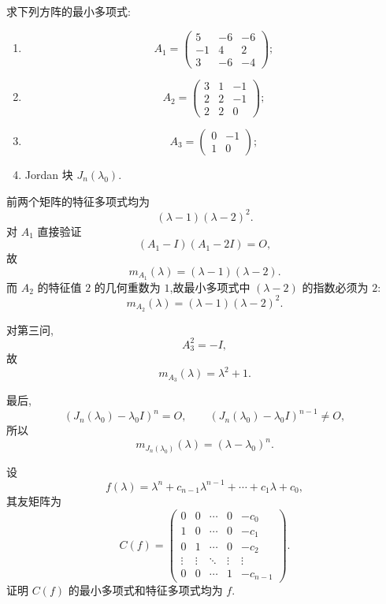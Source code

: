 \begin{example}
求下列方阵的最小多项式:
\begin{enumerate}
    \item
    \[
    A_1=
    \begin{pmatrix}
    5&-6&-6\\
    -1&4&2\\
    3&-6&-4
    \end{pmatrix};
    \]
    \item
    \[
    A_2=
    \begin{pmatrix}
    3&1&-1\\
    2&2&-1\\
    2&2&0
    \end{pmatrix};
    \]
    \item
    \[
    A_3=
    \begin{pmatrix}
    0&-1\\
    1&0
    \end{pmatrix};
    \]
    \item Jordan 块 $J_n(\lambda_0)$.
\end{enumerate}
\end{example}
\exampleblank

\begin{solution}
前两个矩阵的特征多项式均为
\[
(\lambda-1)(\lambda-2)^2.
\]
对 $A_1$ 直接验证
\[
(A_1-I)(A_1-2I)=O,
\]
故
\[
\boxed{m_{A_1}(\lambda)=(\lambda-1)(\lambda-2)}.
\]
而 $A_2$ 的特征值 $2$ 的几何重数为 $1$,故最小多项式中
$(\lambda-2)$ 的指数必须为 $2$:
\[
\boxed{m_{A_2}(\lambda)=(\lambda-1)(\lambda-2)^2}.
\]

对第三问,
\[
A_3^2=-I,
\]
故
\[
\boxed{m_{A_3}(\lambda)=\lambda^2+1}.
\]

最后,
\[
(J_n(\lambda_0)-\lambda_0I)^n=O,
\qquad
(J_n(\lambda_0)-\lambda_0I)^{n-1}\neq O,
\]
所以
\[
\boxed{m_{J_n(\lambda_0)}(\lambda)=(\lambda-\lambda_0)^n}.
\]
\end{solution}


\begin{example}[\marktwostar]
设
\[
f(\lambda)=\lambda^n+c_{n-1}\lambda^{n-1}+\cdots+c_1\lambda+c_0,
\]
其友矩阵为
\[
C(f)=
\begin{pmatrix}
0&0&\cdots&0&-c_0\\
1&0&\cdots&0&-c_1\\
0&1&\cdots&0&-c_2\\
\vdots&\vdots&\ddots&\vdots&\vdots\\
0&0&\cdots&1&-c_{n-1}
\end{pmatrix}.
\]
证明 $C(f)$ 的最小多项式和特征多项式均为 $f$.
\end{example}
\exampleblank


